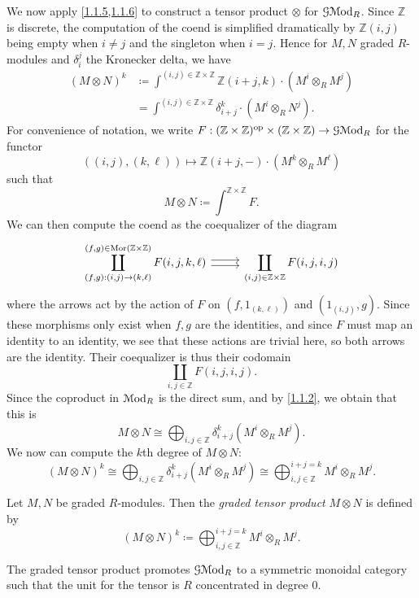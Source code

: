 \begin{construction}\label{1.1.7}
	We now apply \cref{1.1.5,1.1.6} to construct a tensor product $\otimes $ for $\mathcal{G} \mathcal{M}\mathrm{od} _R$. Since $\mathbb{Z} $ is discrete, the computation of the coend is simplified dramatically by $\mathbb{Z} (i,j)$ being empty when $i\neq j$ and the singleton when $i=j$. Hence for $M,N$ graded $R$-modules and $\delta _{i}^j $ the Kronecker delta, we have
	\begin{align*}
		(M\otimes N)^k &\coloneqq \int^{(i,j)\in \mathbb{Z} \times \mathbb{Z} } \mathbb{Z} (i+j,k)\cdot \left( M^i \otimes_R M^j \right) \\
			       &=\int^{(i,j)\in\mathbb{Z} \times \mathbb{Z} } \delta_{i+j}^k \cdot \left( M^i\otimes _RN^j \right).
	\end{align*}
	For convenience of notation, we write $F : (\mathbb{Z} \times \mathbb{Z} )^{\mathrm{op}} \times (\mathbb{Z} \times \mathbb{Z} ) \to \mathcal{G} \mathcal{M}\mathrm{od} _R$ for the functor
	\[
		((i,j),(k,\ell ))\mapsto \mathbb{Z} (i+j,-)\cdot \left( M^k\otimes _R M^\ell  \right) 
	\]
	such that
	\[
		M\otimes N \coloneqq \int^{\mathbb{Z} \times \mathbb{Z} } F
	.\]
	We can then compute the coend as the coequalizer of the diagram
	\[\begin{tikzcd}[column sep=2.5em]
	{\displaystyle{\coprod_{(f,g) : (i,j)\to (k,\ell )}^{(f,g)\in\Mor(\mathbb{Z}\times \mathbb{Z} )}F(i,j,k,\ell) }} \ar[shift left, r] \ar[shift right, r] & {\displaystyle{\coprod_{(i,j)\in\mathbb{Z}\times \mathbb{Z} }F(i,j,i,j)}}
\end{tikzcd}\]
	where the arrows act by the action of $F$ on $(f,1_{(k,\ell )} )$ and $(1_{(i,j)} ,g)$. Since these morphisms only exist when $f,g$ are the identities, and since $F$ must map an identity to an identity, we see that these actions are trivial here, so both arrows are the identity. Their coequalizer is thus their codomain
	\[
		\coprod_{i,j\in\mathbb{Z} } F(i,j,i,j)
	.\]
	Since the coproduct in $\mathcal{M}\mathrm{od} _R$ is the direct sum, and by \cref{1.1.2}, we obtain that this is
	\[
		M\otimes N \cong \bigoplus_{i,j\in\mathbb{Z} } \delta _{i+j}^k \left( M^i\otimes _RM^j \right) 
	.\]
	We now can compute the $k$th degree of $M\otimes N$:
	\[
		(M\otimes N)^k \cong \bigoplus_{i,j\in\mathbb{Z} } \delta _{i+j} ^k \left( M^i\otimes_RM^j \right) \cong \bigoplus_{i,j\in\mathbb{Z}}^{i+j=k}M^i\otimes _RM^j
	.\]
\end{construction}
\begin{definition}\label{1.1.8}
	Let $M,N$ be graded $R$-modules. Then the \emph{graded tensor product} $M\otimes N$ is defined by
	\[
		(M\otimes N)^k \coloneqq \bigoplus_{i,j\in\mathbb{Z} }^{i+j=k} M^i\otimes _RM^j
	.\]
\end{definition}
\begin{proposition}\label{1.1.9}
	The graded tensor product promotes $\mathcal{G} \mathcal{M}\mathrm{od} _R$ to a symmetric monoidal category such that the unit for the tensor is $R$ concentrated in degree 0.
\end{proposition}

